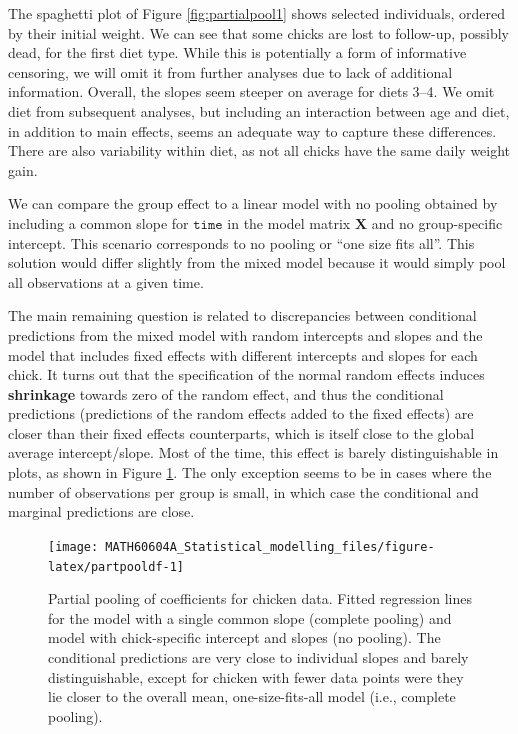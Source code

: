 \documentclass[
  11pt,
  letterpaper,
]{book}
\theoremstyle{definition}
\theoremstyle{definition}
\theoremstyle{definition}
\theoremstyle{definition}
\theoremstyle{remark}
\begin{document}
The spaghetti plot of Figure \ref{fig:partialpool1} shows selected individuals, ordered by their initial weight. We can see that some chicks are lost to follow-up, possibly dead, for the first diet type. While this is potentially a form of informative censoring, we will omit it from further analyses due to lack of additional information. Overall, the slopes seem steeper on average for diets 3--4. We omit diet from subsequent analyses, but including an interaction between age and diet, in addition to main effects, seems an adequate way to capture these differences. There are also variability within diet, as not all chicks have the same daily weight gain.

We can compare the group effect to a linear model with no pooling obtained by including a common slope for \(\texttt{time}\) in the model matrix \(\mathbf{X}\) and no group-specific intercept. This scenario corresponds to no pooling or ``one size fits all''. This solution would differ slightly from the mixed model because it would simply pool all observations at a given time.

The main remaining question is related to discrepancies between conditional predictions from the mixed model with random intercepts and slopes and the model that includes fixed effects with different intercepts and slopes for each chick. It turns out that the specification of the normal random effects induces \textbf{shrinkage} towards zero of the random effect, and thus the conditional predictions (predictions of the random effects added to the fixed effects) are closer than their fixed effects counterparts, which is itself close to the global average intercept/slope. Most of the time, this effect is barely distinguishable in plots, as shown in Figure \ref{fig:partpooldf}. The only exception seems to be in cases where the number of observations per group is small, in which case the conditional and marginal predictions are close.

\begin{figure}

{\centering \texttt{[image: MATH60604A\_Statistical\_modelling\_files/figure-latex/partpooldf-1]} 

}

\caption{Partial pooling of coefficients for chicken data. Fitted regression lines for the model with a single common slope (complete pooling) and model with chick-specific intercept and slopes (no pooling). The conditional predictions are very close to individual slopes and barely distinguishable, except for chicken with fewer data points were they lie closer to the overall mean, one-size-fits-all model (i.e., complete pooling).}\label{fig:partpooldf}
\end{figure}
\end{document}

